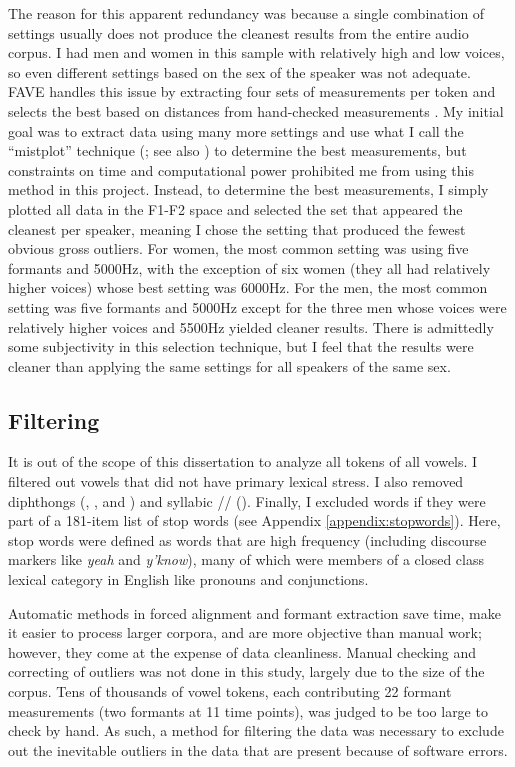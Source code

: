 The reason for this apparent redundancy was because a single combination of settings usually does not produce the cleanest results from the entire audio corpus. I had men and women in this sample with relatively high and low voices, so even different settings based on the sex of the speaker was not adequate. FAVE handles this issue by extracting four sets of measurements per token and selects the best based on distances from hand-checked measurements \citep[34--36]{labov_etal_2013}. My initial goal was to extract data using many more settings and use what I call the ``mistplot'' technique (\citealt{stanley_2018_mistplots}; see also \citealt{kendall_vaughn_2015}) to determine the best measurements, but constraints on time and computational power prohibited me from using this method in this project. Instead, to determine the best measurements, I simply plotted all data in the F1-F2 space and selected the set that appeared the cleanest per speaker, meaning I chose the setting that produced the fewest obvious gross outliers. For women, the most common setting was using five formants and 5000Hz, with the exception of six women (they all had relatively higher voices) whose best setting was 6000Hz. For the men, the most common setting was five formants and 5000Hz except for the three men whose voices were relatively higher voices and 5500Hz yielded cleaner results. There is admittedly some subjectivity in this selection technique, but I feel that the results were cleaner than applying the same settings for all speakers of the same sex.

\subsection{Filtering}
\label{filtering}

It is out of the scope of this dissertation to analyze all tokens of all vowels. I filtered out vowels that did not have primary lexical stress. I also removed diphthongs (\price, \mouth, and \choice) and syllabic /\textipa{\textrhookschwa}/ (\nurse). Finally, I excluded words if they were part of a 181-item list of stop words (see Appendix \ref{appendix:stopwords}). Here, stop words were defined as words that are high frequency (including discourse markers like \textit{yeah} and \textit{y'know}), many of which were members of a closed class lexical category in English like pronouns and conjunctions.

Automatic methods in forced alignment and formant extraction save time, make it easier to process larger corpora, and are more objective than manual work; however, they come at the expense of data cleanliness. Manual checking and correcting of outliers was not done in this study, largely due to the size of the corpus. Tens of thousands of vowel tokens, each contributing 22 formant measurements (two formants at 11 time points), was judged to be too large to check by hand. As such, a method for filtering the data was necessary to exclude out the inevitable outliers in the data that are present because of software errors.

